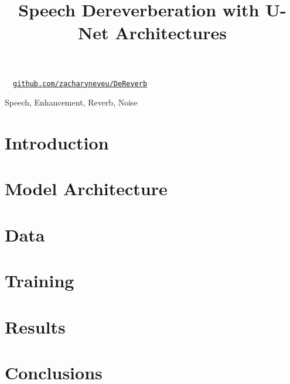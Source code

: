 \documentclass{article}
\title{Speech Dereverberation with U-Net Architectures}
\begin{document}
%

\maketitle
%

\begin{center}
\ \ \href{https://github.com/zacharyneveu/DeReverb}{\texttt{github.com/zacharyneveu/DeReverb}}
\end{center}

\begin{abstract}

\end{abstract}
%
\begin{keywords}
Speech, Enhancement, Reverb, Noise
\end{keywords}
%
\section{Introduction}
\label{sec:intro}


\section{Model Architecture}%
\label{sec:model_architecture}


\section{Data}%
\label{sec:data}


\section{Training}%
\label{sec:data_and_training}


\section{Results}%
\label{sec:results}


\section{Conclusions}%
\label{sec:conclusions}







\end{document}
